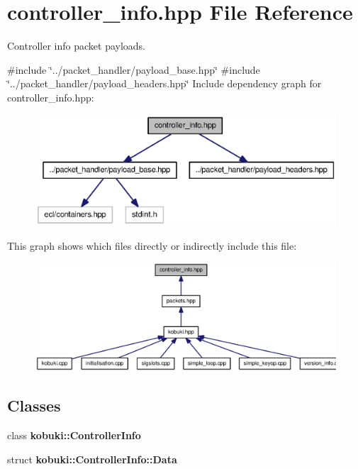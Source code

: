 \section{controller\-\_\-info.\-hpp \-File \-Reference}
\label{controller__info_8hpp}


\-Controller info packet payloads.  


{\ttfamily \#include \char`\"{}../packet\-\_\-handler/payload\-\_\-base.\-hpp\char`\"{}}\*
{\ttfamily \#include \char`\"{}../packet\-\_\-handler/payload\-\_\-headers.\-hpp\char`\"{}}\*
\-Include dependency graph for controller\-\_\-info.\-hpp\-:
\nopagebreak
\begin{figure}[H]
\begin{center}
\leavevmode
\includegraphics[width=350pt]{controller__info_8hpp__incl}
\end{center}
\end{figure}
\-This graph shows which files directly or indirectly include this file\-:
\nopagebreak
\begin{figure}[H]
\begin{center}
\leavevmode
\includegraphics[width=350pt]{controller__info_8hpp__dep__incl}
\end{center}
\end{figure}
\subsection*{\-Classes}
\begin{DoxyCompactItemize}
\item 
class {\bf kobuki\-::\-Controller\-Info}
\item 
struct {\bf kobuki\-::\-Controller\-Info\-::\-Data}
\end{DoxyCompactItemize}

